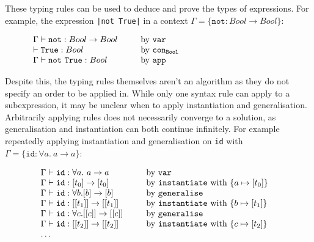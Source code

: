 \documentclass[a4paper,fleqn,oneside,12pt]{report}
\begin{document}
These typing rules can be used to deduce and prove the types of expressions. For example, the expression \texttt{|not True|} in a context $\Gamma = \{ \mathtt{not} : Bool \rightarrow Bool \}$:

$$
\begin{array}{lclc}
  \Gamma \vdash \mathtt{not} : Bool \rightarrow Bool & \hspace{0.25cm} & \textrm{by}\ \mathtt{var}        & \hspace{4cm} \\
  \vdash \mathtt{True} : Bool                        &                 & \textrm{by}\ \mathtt{con_{Bool}} & \\
  \Gamma \vdash \mathtt{not\ True} : Bool            &                 & \textrm{by}\ \mathtt{app}        & \\
\end{array}
$$

Despite this, the typing rules themselves aren't an algorithm as they do not specify an order to be applied in. While only one syntax rule can apply to a subexpression, it may be unclear when to apply instantiation and generalisation. Arbitrarily applying rules does not necessarily converge to a solution, as generalisation and instantiation can both continue infinitely. For example repeatedly applying instantiation and generalisation on \texttt{id} with $\Gamma = \{ \mathtt{id} : \forall a.\ a \rightarrow a \}$:

$$
\begin{array}{lclc}
  \Gamma \vdash \mathtt{id} : \forall a.\ a \rightarrow a & \hspace{0.25cm} & \textrm{by}\ \mathtt{var} & \\
  \Gamma \vdash \mathtt{id} : [t_0] \rightarrow [t_0] & & \textrm{by}\ \mathtt{instantiate}\ \textrm{with}\ \{ a \mapsto [t_0] \}& \\
  \Gamma \vdash \mathtt{id} : \forall b. [b] \rightarrow [b] & & \textrm{by}\ \mathtt{generalise} & \\
  \Gamma \vdash \mathtt{id} : [[t_1]] \rightarrow [[t_1]] & & \textrm{by}\ \mathtt{instantiate}\ \textrm{with}\ \{ b \mapsto [t_1] \} & \\
  \Gamma \vdash \mathtt{id} : \forall c. [[c]] \rightarrow [[c]] & & \textrm{by}\ \mathtt{generalise} & \\
  \Gamma \vdash \mathtt{id} : [[t_2]] \rightarrow [[t_2]] & & \textrm{by}\ \mathtt{instantiate}\ \textrm{with}\ \{ c \mapsto [t_2] \} & \\
  \dots & & & \\
\end{array}
$$
\end{document}
